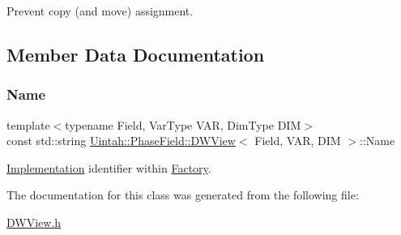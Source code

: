 Prevent copy (and move) assignment. 



\subsection{Member Data Documentation}
\mbox{\label{classUintah_1_1PhaseField_1_1DWView_ac73a7615df07e872d793511a215dd599}} 
\subsubsection{\texorpdfstring{Name}{Name}}
{\footnotesize\ttfamily template$<$typename Field, Var\+Type V\+AR, Dim\+Type D\+IM$>$ \\
const std\+::string \hyperlink{classUintah_1_1PhaseField_1_1DWView}{Uintah\+::\+Phase\+Field\+::\+D\+W\+View}$<$ Field, V\+AR, D\+IM $>$\+::Name\hspace{0.3cm}{\ttfamily [static]}}



\hyperlink{classUintah_1_1PhaseField_1_1Implementation}{Implementation} identifier within \hyperlink{classUintah_1_1PhaseField_1_1Factory}{Factory}. 



The documentation for this class was generated from the following file\+:\begin{DoxyCompactItemize}
\item 
\hyperlink{DWView_8h}{D\+W\+View.\+h}\end{DoxyCompactItemize}
